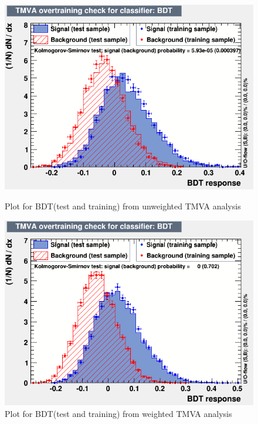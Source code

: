 \documentclass[english]{article}
\begin{document}
\begin{figure}[!htb]
	\includegraphics[width=\linewidth]{BDT_tt_u}
	\caption{Plot for BDT(test and training) from unweighted TMVA analysis}
\endminipage\hfill
{}
	\includegraphics[width=\linewidth]{BDT_tt_w}
	\caption{Plot for BDT(test and training) from weighted TMVA analysis}
\endminipage\hfill
\end{figure}
\end{document}
